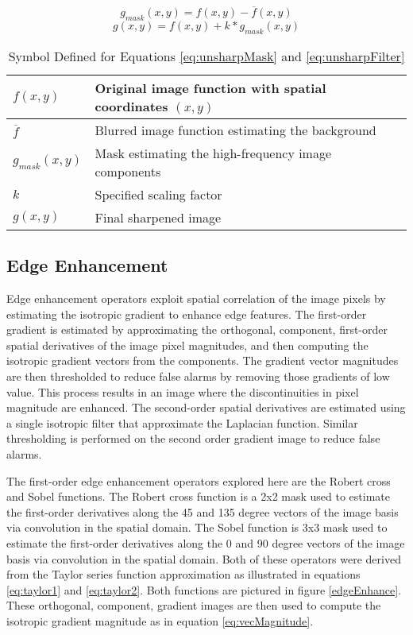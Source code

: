 \documentclass[journal]{IEEEtran}
\begin{document}
\begin{equation} \label{eq:unsharpMask}
g_{mask}(x,y) = f(x,y) - \overline{f}(x,y)
\end{equation}
\begin{equation} \label{eq:unsharpFilter}
g(x,y) = f(x,y) + k * g_{mask}(x,y)
\end{equation}

\begin{table}[h]
 \centering
 \begin{tabular}{|l|l|}
  \hline
  \(f(x,y)\) & Original image function with spatial coordinates \((x,y)\)\\ \hline
  \(\overline{f}\) & Blurred image function estimating the background \\ \hline
  \(g_{mask}(x,y)\) & Mask estimating the high-frequency image components \\ \hline
  \(k\) & Specified scaling factor \\ \hline
  \(g(x,y)\) & Final sharpened image \\ \hline
 \end{tabular}
 \caption{Symbol Defined for Equations \ref{eq:unsharpMask} and \ref{eq:unsharpFilter}}
 \label{tab:unsharpMasking}
\end{table}

\subsection{Edge Enhancement}
Edge enhancement operators exploit spatial correlation of the image pixels by estimating the isotropic gradient to enhance edge features. The first-order gradient is estimated by approximating the orthogonal, component, first-order spatial derivatives of the image pixel magnitudes, and then computing the isotropic gradient vectors from the components. The gradient vector magnitudes are then thresholded to reduce false alarms by removing those gradients of low value. This process results in an image where the discontinuities in pixel magnitude are enhanced. The second-order spatial derivatives are estimated using a single isotropic filter that approximate the Laplacian function. Similar thresholding is performed on the second order gradient image to reduce false alarms.

\par The first-order edge enhancement operators explored here are the Robert cross and Sobel functions. The Robert cross function is a 2x2 mask used to estimate the first-order derivatives along the 45 and 135 degree vectors of the image basis via convolution in the spatial domain. The Sobel function is 3x3 mask used to estimate the first-order derivatives along the 0 and 90 degree vectors of the image basis via convolution in the spatial domain. Both of these operators were derived from the Taylor series function approximation as illustrated in equations \ref{eq:taylor1} and \ref{eq:taylor2}. Both functions are pictured in figure \ref{edgeEnhance}. These orthogonal, component, gradient images are then used to compute the isotropic gradient magnitude as in equation \ref{eq:vecMagnitude}. \cite[p.~119-129]{Nixon}
\end{document}
